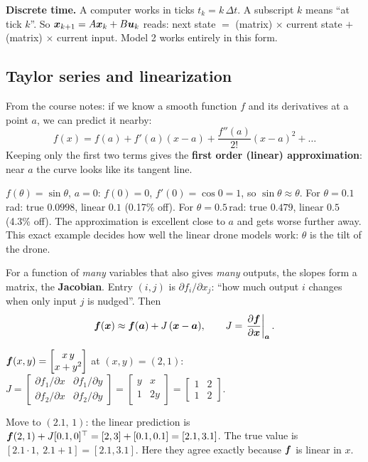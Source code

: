 \textbf{Discrete time.} A computer works in ticks $t_k=k\,\Delta t$. A subscript $k$ means ``at tick $k$''. So
$\bm{x}_{k+1}=A\bm{x}_k+B\bm{u}_k$ reads: next state $=$ (matrix) $\times$ current state $+$ (matrix) $\times$ current input.
Model 2 works entirely in this form.

\subsection{Taylor series and linearization}
\label{sec:taylor}

From the course notes: if we know a smooth function $f$ and its derivatives at a point $a$, we can predict it nearby:
\[
f(x)=f(a)+f'(a)(x-a)+\frac{f''(a)}{2!}(x-a)^2+\dots
\]
Keeping only the first two terms gives the \textbf{first order (linear) approximation}: near $a$ the curve looks like
its tangent line.
\begin{toy}
$f(\theta)=\sin\theta$, $a=0$: $f(0)=0$, $f'(0)=\cos0=1$, so $\sin\theta\approx\theta$.
For $\theta=0.1$\,rad: true $0.0998$, linear $0.1$ (0.17\% off). For $\theta=0.5$\,rad: true $0.479$, linear $0.5$
(4.3\% off). The approximation is excellent close to $a$ and gets worse further away. This exact example decides how
well the linear drone models work: $\theta$ is the tilt of the drone.
\end{toy}

For a function of \emph{many} variables that also gives \emph{many} outputs, the slopes form a matrix, the
\textbf{Jacobian}. Entry $(i,j)$ is $\partial f_i/\partial x_j$: ``how much output $i$ changes when only input $j$ is
nudged''. Then
\[
\bm{f}(\bm{x})\approx\bm{f}(\bm a)+J\,(\bm{x}-\bm a),\qquad J=\left.\frac{\partial\bm{f}}{\partial\bm{x}}\right|_{\bm a}.
\]
\begin{toy}
$\bm{f}(x,y)=\begin{bmatrix}x\,y\\ x+y^2\end{bmatrix}$ at $(x,y)=(2,1)$:\quad
$J=\begin{bmatrix}\partial f_1/\partial x&\partial f_1/\partial y\\ \partial f_2/\partial x&\partial f_2/\partial y\end{bmatrix}=
\begin{bmatrix}y&x\\1&2y\end{bmatrix}=\begin{bmatrix}1&2\\1&2\end{bmatrix}$.

Move to $(2.1,\,1)$: the linear prediction is $\bm{f}(2,1)+J[0.1,0]^\top=[2,3]+[0.1,0.1]=[2.1,3.1]$. The true value is
$[2.1\cdot1,\ 2.1+1]=[2.1,3.1]$. Here they agree exactly because $\bm{f}$ is linear in $x$.
\end{toy}

